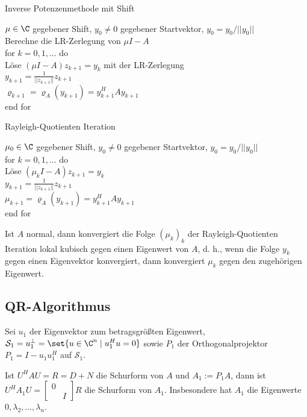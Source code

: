 \begin{karte}{Inverse Potenzenmethode mit Shift}
    \begin{tabbing}
        \( \mu \in \C \) gegebener Shift, \(y_0 \neq 0\) gegebener Startvektor, \(y_0 = y_0 / ||y_0||\) \\
        Berechne die LR-Zerlegung von \( \mu I - A \)\\
        for \= \( k = 0,1,\ldots \) do \\
        \> Löse \( (\mu I - A) z_{k+1} = y_k \) mit der LR-Zerlegung \\
        \> \( y_{k+1} = \frac{1}{||z_{k+1}||} z_{k+1}\) \\
        \> \( \varrho_{k+1} = \varrho_A(y_{k+1}) = y_{k+1}^H A y_{k+1} \) \\
        end for
    \end{tabbing}
\end{karte}

\begin{karte}{Rayleigh-Quotienten Iteration}
    \begin{tabbing}
        \( \mu_0 \in \C \) gegebener Shift, \(y_0 \neq 0\) gegebener Startvektor, \(y_0 = y_0 / ||y_0||\) \\
        for \= \( k = 0,1,\ldots \) do \\
        \> Löse \( (\mu_k I - A) z_{k+1} = y_k \) \\
        \> \( y_{k+1} = \frac{1}{||z_{k+1}||} z_{k+1}\) \\
        \> \( \mu_{k+1} = \varrho_A(y_{k+1}) = y_{k+1}^H A y_{k+1} \) \\
        end for
    \end{tabbing}
    
    Ist \(A\) normal, dann konvergiert die Folge \( (\mu_k)_k \) der Rayleigh-Quotienten Iteration 
    lokal kubisch gegen einen Eigenwert von \(A\), d. h., wenn die Folge \(y_k\) gegen einen Eigenvektor 
    konvergiert, dann konvergiert \(\mu_k\) gegen den zugehörigen Eigenwert.
\end{karte}

\subsection{QR-Algorithmus}

\begin{karte}{}
    Sei \( u_1 \) der Eigenvektor zum betragsgrößten Eigenwert, 
    \( \mathcal{S}_1 = u_1^\bot = \set{u \in \C^n \;|\; u_1^H u = 0} \)
    sowie \( P_1 \) der Orthogonalprojektor \( P_1 = I - u_1 u_1^H \) auf \( \mathcal{S}_1 \).
    
    Ist \( U^H A U = R = D + N \) die Schurform von \(A\) und \( A_1 := P_1 A \), 
    dann ist \( U^H A_1 U =\left[ \begin{matrix}
        0 & \\
        & I
    \end{matrix}\right] R \) die Schurform von \(A_1\). 
    Insbesondere hat \( A_1 \) die Eigenwerte \( 0, \lambda_2,\ldots, \lambda_n \).
\end{karte}

